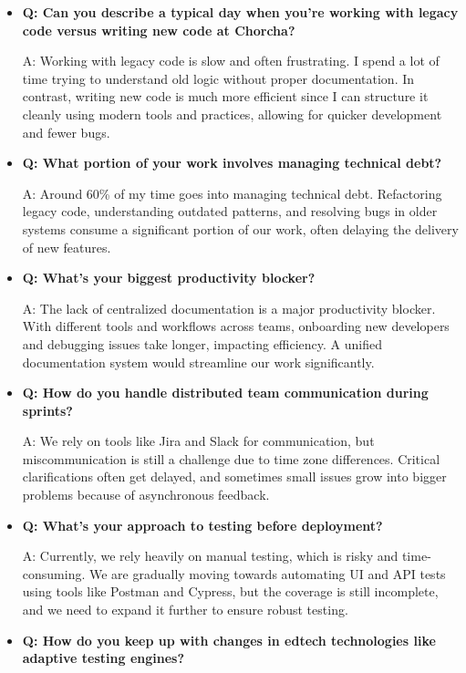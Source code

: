 \documentclass[12pt,a4paper,oneside]{book}
\begin{document}
\begin{itemize}
  \item \textbf{Q: Can you describe a typical day when you’re working with legacy code versus writing new code at Chorcha?}

A: Working with legacy code is slow and often frustrating. I spend a lot of time trying to understand old logic without proper documentation. In contrast, writing new code is much more efficient since I can structure it cleanly using modern tools and practices, allowing for quicker development and fewer bugs.

\item \textbf{Q: What portion of your work involves managing technical debt?} 

A: Around 60\% of my time goes into managing technical debt. Refactoring legacy code, understanding outdated patterns, and resolving bugs in older systems consume a significant portion of our work, often delaying the delivery of new features.

\item \textbf{Q: What’s your biggest productivity blocker?}

A: The lack of centralized documentation is a major productivity blocker. With different tools and workflows across teams, onboarding new developers and debugging issues take longer, impacting efficiency. A unified documentation system would streamline our work significantly.

\item \textbf{Q: How do you handle distributed team communication during sprints?}

A: We rely on tools like Jira and Slack for communication, but miscommunication is still a challenge due to time zone differences. Critical clarifications often get delayed, and sometimes small issues grow into bigger problems because of asynchronous feedback.

\item \textbf{Q: What’s your approach to testing before deployment?} 

A: Currently, we rely heavily on manual testing, which is risky and time-consuming. We are gradually moving towards automating UI and API tests using tools like Postman and Cypress, but the coverage is still incomplete, and we need to expand it further to ensure robust testing.

\item \textbf{Q: How do you keep up with changes in edtech technologies like adaptive testing engines?} 


\end{itemize}
\end{document}
